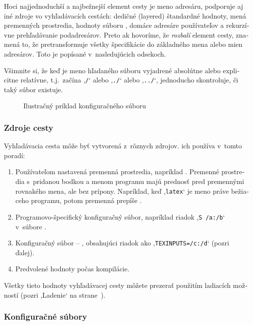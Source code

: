 \documentclass[\classoptions,slovak,english,czech]{\classname}
\newcommand{\singleuv}[1]{,#1`}
\begin{document}
\begin{otherlanguage}{slovak}
Hoci najjednoduchší a najbežnejší element cesty je meno adresáru,
\KPS{} podporuje aj iné zdroje vo vyhľadávacích cestách: dedičné
(layered) štandardné hodnoty, mená premenných prostredia, hodnoty
súboru , domáce adresáre používateľov a rekurzívne
prehľadávanie podadresárov. Preto ak hovoríme, že \KPS{}
\emph{rozbalí} element cesty, znamená to, že pretransformuje všetky
špecifikácie do základného mena alebo mien adresárov. Toto je
popísané v~nasledujúcich odsekoch.

Všimnite si, že keď je meno hľadaného súboru vyjadrené absolútne
alebo explicitne relatívne, t.j.\ začína \singleuv{\texttt{/}} alebo \singleuv{\texttt{./}}
alebo \singleuv{\texttt{../}}, \KPS{} jednoducho skontroluje, či taký súbor
existuje.
\ifSingleColumn
\else
\begin{figure*}

\setlength{\abovecaptionskip}{0pt}
  \caption{Ilustračný príklad konfiguračného súboru}
  \label{fig:configsample}
\end{figure*}
\fi

\subsubsection{Zdroje cesty}
\label{sec:pathsources}
Vyhľadávacia cesta môže byť vytvorená z~rôznych zdrojov.
\KPS{} ich používa v~tomto poradí:
\begin{enumerate}
\item
  Používateľom nastavená premenná prostredia, napríklad \@.
  Premenné prostredia s~pridanou bodkou a menom programu majú prednosť pred
premennými rovnakého mena, ale bez prípony.
  Napríklad, keď \singleuv{\texttt{latex}} je meno práve bežiaceho programu, potom
  premenná  prepíše .
\item
  Programovo-špecifický konfiguračný súbor, napríklad riadok
  \singleuv{\texttt{S /a:/b}} v~súbore  .
\item Konfiguračný súbor \KPS{} -- , obsahujúci riadok
  ako \singleuv{\texttt{TEXINPUTS=/c:/d}} (pozri ďalej).
\item Predvolené hodnoty počas kompilácie.
\end{enumerate}
\noindent Všetky tieto hodnoty vyhľadávacej cesty môžete prezerať
použitím ladiacích možností (pozri \singleuv{Ladenie} na
strane~\pageref{sec:debugging}).

\subsubsection{Konfiguračné súbory}
\label{sec:configfiles}


\end{otherlanguage}
\end{document}
